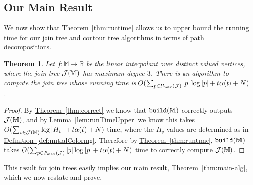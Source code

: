 \documentclass[11pt]{article}
\newtheorem{theorem}{Theorem}[section]
\theoremstyle{definition}
\newcommand{\cJ}{{\cal J}}
\newcommand{\MM}{\mathbb{M}}
\newcommand{\RR}{\mathbb{R}}
\newcommand{\Thm}[1]{\hyperref[thm:#1]{Theorem~\ref*{thm:#1}}} %
\newcommand{\Lem}[1]{\hyperref[lem:#1]{Lemma~\ref*{lem:#1}}} %
\newcommand{\Def}[1]{\hyperref[def:#1]{Definition~\ref*{def:#1}}} %
\newcommand{\build}{{\tt build}}
\newcommand{\pmax}{P_{\max}}
\begin{document}
\subsection{Our Main Result}
\label{sec:implications}

We now show that \Thm{runtime} allows us to upper bound the running time for our join tree and contour 
tree algorithms in terms of path decompositions.

\begin{theorem}
Let $f:\MM \to \RR$ be the linear interpolant over distinct valued vertices, where the join tree $\cJ(\MM)$ has maximum degree $3$.
There is an algorithm to compute the join tree whose running time is $O(\sum_{p \in \pmax(\cJ)} |p|\log |p| + t\alpha(t) + N)$.
\end{theorem}
\begin{proof}
By \Thm{correct} we know that $\build(\MM)$ correctly outputs $\cJ(\MM)$, and by \Lem{runTimeUpper}
we know this takes $O(\sum_{v \in \cJ(\MM)} \log |H_v| + t\alpha(t) + N)$ time, where the $H_v$ values are determined as in \Def{initialColoring}.
Therefore by \Thm{runtime}, $\build(\MM)$ takes $O(\sum_{p \in \pmax(\cJ)} |p|\log |p| + t\alpha(t) + N)$ 
time to correctly compute $\cJ(\MM)$.
\end{proof}

This result for join trees easily implies our main result, \Thm{main-alg}, which we now restate and prove.
\end{document}
